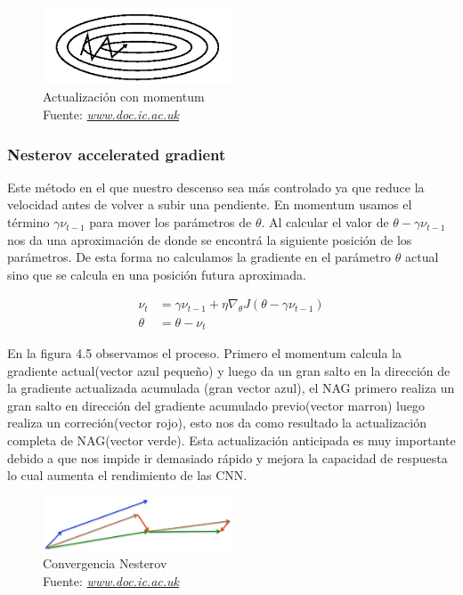 \begin{figure}[H]
	\centering
	\includegraphics[width=0.5\textwidth]{Figures/momentum2.png}
	\caption{Actualización con momentum \\ Fuente:  \href{https://www.doc.ic.ac.uk/~js4416/163/website/neural-networks/optimisers.html}{\textit{www.doc.ic.ac.uk}}}
	\label{momentum2 }
\end{figure}

\subsubsection{Nesterov accelerated gradient}
Este método en el que nuestro descenso sea más controlado ya que reduce la velocidad antes de volver a subir una pendiente. En momentum usamos el término $\gamma \nu_{t-1}$ para mover los parámetros de $\theta$. Al calcular el valor de $\theta - \gamma \nu_{t-1}$ nos da una aproximación de donde se encontrá la siguiente posición de los parámetros. De esta forma no calculamos la gradiente en el parámetro $\theta$ actual sino que se calcula en una posición futura aproximada.




\begin{equation}
\label{mbgds}
\begin{aligned}
\nu_{t}&=\gamma \nu_{t-1} + \eta \nabla_{\theta} J(\theta- \gamma \nu_{t-1})\\
\theta &= \theta -\nu_{t}
\end{aligned}
\end{equation}

En la figura 4.5 observamos el proceso. Primero el momentum calcula  la gradiente actual(vector azul pequeño)  y luego da un gran salto en la dirección de la gradiente actualizada acumulada (gran vector azul), el NAG primero realiza un gran salto en dirección del gradiente acumulado previo(vector marron) luego realiza un correción(vector rojo), esto nos da como resultado la actualización completa de NAG(vector verde). Esta actualización anticipada es muy importante debido a que nos impide ir demasiado rápido y mejora la capacidad de respuesta lo cual aumenta el rendimiento de las CNN.
\begin{figure}[H]
	\centering
	\includegraphics[width=0.5\textwidth]{Figures/nesterov.png}
	\caption{Convergencia Nesterov\\ Fuente:  \href{https://www.doc.ic.ac.uk/~js4416/163/website/neural-networks/optimisers.html}{\textit{www.doc.ic.ac.uk}}}
	\label{nesterov }
\end{figure}
